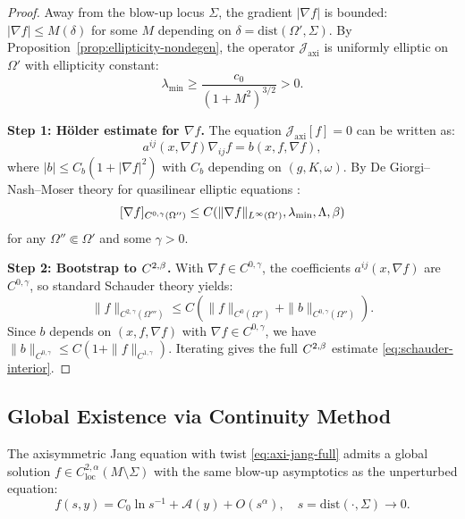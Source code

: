 \begin{proof}
Away from the blow-up locus $\Sigma$, the gradient $|\nabla f|$ is bounded: $|\nabla f| \leq M(\delta)$ for some $M$ depending on $\delta = \mathrm{dist}(\Omega', \Sigma)$. By Proposition~\ref{prop:ellipticity-nondegen}, the operator $\mathcal{J}_{\mathrm{axi}}$ is uniformly elliptic on $\Omega'$ with ellipticity constant:
\[
\lambda_{\min} \geq \frac{c_0}{(1 + M^2)^{3/2}} > 0.
\]

\textbf{Step 1: H\"older estimate for $\nabla f$.}
The equation $\mathcal{J}_{\mathrm{axi}}[f] = 0$ can be written as:
\[
a^{ij}(x, \nabla f) \nabla_{ij} f = b(x, f, \nabla f),
\]
where $|b| \leq C_b(1 + |\nabla f|^2)$ with $C_b$ depending on $(g, K, \omega)$. By De Giorgi--Nash--Moser theory for quasilinear elliptic equations \cite{serrin1964}:
\[
[\nabla f]_{C^{0,\gamma}(\Omega'')} \leq C(\|\nabla f\|_{L^\infty(\Omega')}, \lambda_{\min}, \Lambda, \beta)
\]
for any $\Omega'' \Subset \Omega'$ and some $\gamma > 0$.

\textbf{Step 2: Bootstrap to $C^{2,\beta}$.}
With $\nabla f \in C^{0,\gamma}$, the coefficients $a^{ij}(x, \nabla f)$ are $C^{0,\gamma}$, so standard Schauder theory \cite{gilbargtrudinger2001} yields:
\[
\|f\|_{C^{2,\gamma}(\Omega''')} \leq C\left(\|f\|_{C^0(\Omega'')} + \|b\|_{C^{0,\gamma}(\Omega'')}\right).
\]
Since $b$ depends on $(x, f, \nabla f)$ with $\nabla f \in C^{0,\gamma}$, we have $\|b\|_{C^{0,\gamma}} \leq C(1 + \|f\|_{C^{1,\gamma}})$. Iterating gives the full $C^{2,\beta}$ estimate \eqref{eq:schauder-interior}.
\end{proof}

\subsection{Global Existence via Continuity Method}

\begin{theorem}\label{thm:global-exist-schauder}
The axisymmetric Jang equation with twist \eqref{eq:axi-jang-full} admits a global solution $f \in C^{2,\alpha}_{\mathrm{loc}}(M \setminus \Sigma)$ with the same blow-up asymptotics as the unperturbed equation:
\[
f(s, y) = C_0 \ln s^{-1} + \mathcal{A}(y) + O(s^{\alpha}), \quad s = \mathrm{dist}(\cdot, \Sigma) \to 0.
\]
\end{theorem}


